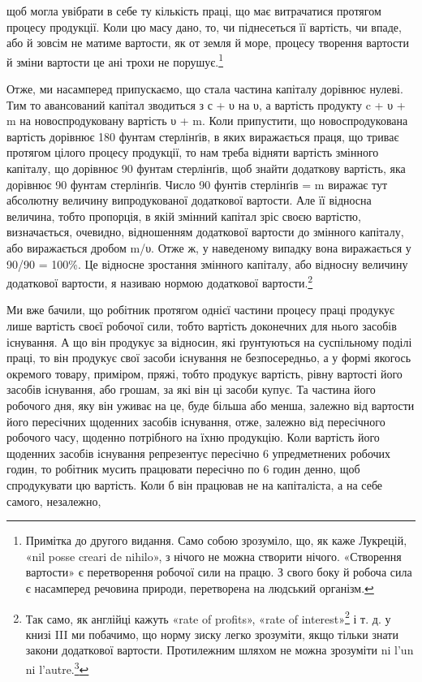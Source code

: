 \parcont{}  %
щоб могла увібрати в себе ту кількість праці, що має витрачатися протягом процесу продукції. Коли цю
масу дано, то, чи піднесеться її вартість, чи впаде, або й зовсім не матиме вартости, як от земля й
море, процесу творення вартости й зміни вартости це ані трохи не порушує.\footnote{
Примітка до другого видання. Само собою зрозуміло, що, як каже Лукрецій, «nil posse creari de
nihilo», з нічого не можна створити нічого. «Створення вартости» є перетворення робочої сили на
працю. З свого боку й робоча сила є насамперед речовина природи, перетворена на людський організм.
}

Отже, ми насамперед припускаємо, що стала частина капіталу дорівнює нулеві. Тим то авансований
капітал зводиться з с + υ на υ, а вартість продукту c + υ + m на новоспродуковану вартість υ + m.
Коли припустити, що новоспродукована вартість дорівнює 180 фунтам стерлінґів, в яких виражається
праця, що триває протягом цілого процесу продукції, то нам треба відняти вартість змінного капіталу,
що дорівнює 90 фунтам стерлінґів, щоб знайти
додаткову вартість, яка дорівнює 90 фунтам стерлінґів. Число 90 фунтів стерлінґів = m виражає тут
абсолютну величину випродукованої додаткової вартости. Але її відносна величина, тобто пропорція, в
якій змінний капітал зріс своєю вартістю, визначається, очевидно, відношенням додаткової вартости до
змінного капіталу, або виражається дробом m/υ. Отже ж, у наведеному випадку вона виражається у 90/90
= 100\%. Це відносне зростання
змінного капіталу, або відносну величину додаткової вартости, я називаю нормою додаткової
вартости.\footnote{
Так само, як англійці кажуть «rate of profits», «rate of interest»\footnote*{
— «норма зиску», «норма процента». Ред.
} і т. д. у книзі III ми
побачимо, що норму зиску легко зрозуміти, якщо тільки знати закони додаткової вартости. Протилежним
шляхом не можна зрозуміти ni l’un ni l’autre.\footnote*{
— ні того, ні другого. Ред.
}
}

Ми вже бачили, що робітник протягом однієї частини процесу праці продукує лише вартість своєї
робочої сили, тобто вартість доконечних для нього засобів існування. А що він продукує за відносин,
які ґрунтуються на суспільному поділі праці, то він продукує свої засоби існування не безпосередньо,
а у формі якогось окремого товару, приміром, пряжі, тобто продукує вартість, рівну вартості його
засобів існування, або грошам, за які
він ці засоби купує. Та частина його робочого дня, яку він уживає на це, буде більша або менша,
залежно від вартости його пересічних щоденних засобів існування, отже, залежно від пересічного
робочого часу, щоденно потрібного на їхню продукцію. Коли вартість його щоденних засобів існування
репрезентує пересічно
6 упредметнених робочих годин, то робітник мусить працювати пересічно по 6 годин денно, щоб
спродукувати цю вартість. Коли б він працював не на капіталіста, а на себе самого, незалежно,
\parbreak{}  %
